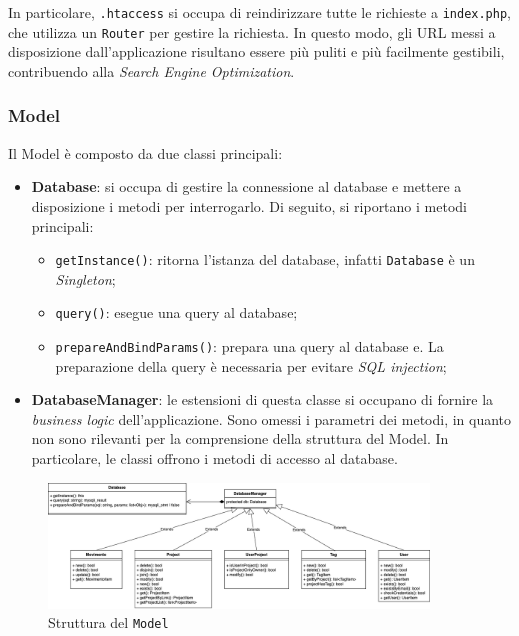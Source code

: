 In particolare, \texttt{.htaccess} si occupa di reindirizzare tutte le richieste
a \texttt{index.php}, che utilizza un \texttt{Router} per gestire la richiesta.
In questo modo, gli URL messi a disposizione dall'applicazione risultano essere
più puliti e più facilmente gestibili, contribuendo alla \textit{Search Engine
Optimization}.

\subsubsection{Model}

Il Model è composto da due classi principali:
\begin{itemize}
	\item \textbf{Database}: si occupa di gestire la connessione al database e
		mettere a disposizione i metodi per interrogarlo. Di seguito, si 
		riportano i metodi principali:

		\begin{itemize}
			\item \texttt{getInstance()}: ritorna l'istanza del database,
				infatti \texttt{Database} è un \textit{Singleton};

			\item \texttt{query()}: esegue una query al database;

			\item \texttt{prepareAndBindParams()}: prepara una query al database
				e. La preparazione della query è necessaria per evitare 
				\textit{SQL injection};
	\end{itemize}

	\item \textbf{DatabaseManager}: le estensioni di questa classe si occupano
		di fornire la \textit{business logic} dell'applicazione. Sono omessi i
		parametri dei metodi, in quanto non sono rilevanti per la comprensione
		della struttura del Model. In particolare, le classi offrono i metodi di
		accesso al database.
\end{itemize}

\begin{figure}[H]
	\centering
	\includegraphics[width=0.9\textwidth]{figures/ModelClassDiagram.png}
	\caption{Struttura del \texttt{Model}}
\end{figure}

